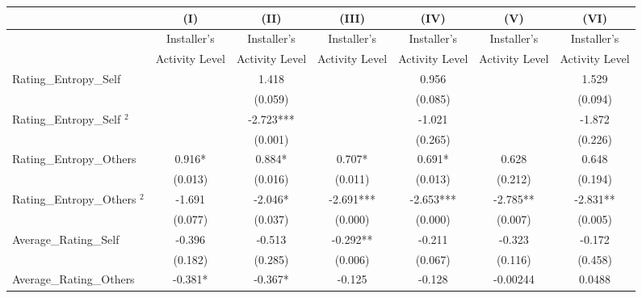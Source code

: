\begin{table}[]
\centering
\begin{threeparttable}[t]
\begin{tabular}{@{}lcccccc@{}}
\toprule
                             & (I)            & (II)           & (III)          & (IV)           & (V)            & (VI)           \\ \midrule
                             & Installer's    & Installer's    & Installer's    & Installer's    & Installer's    & Installer's    \\
                             & Activity Level & Activity Level & Activity Level & Activity Level & Activity Level & Activity Level \\
Rating\_Entropy\_Self        &                & 1.418          &                & 0.956          &                & 1.529          \\
                             &                & (0.059)        &                & (0.085)        &                & (0.094)        \\
Rating\_Entropy\_Self $^2$   &                & -2.723***      &                & -1.021         &                & -1.872         \\
                             &                & (0.001)        &                & (0.265)        &                & (0.226)        \\
Rating\_Entropy\_Others      & 0.916*         & 0.884*         & 0.707*         & 0.691*         & 0.628          & 0.648          \\
                             & (0.013)        & (0.016)        & (0.011)        & (0.013)        & (0.212)        & (0.194)        \\
Rating\_Entropy\_Others $^2$ & -1.691         & -2.046*        & -2.691***      & -2.653***      & -2.785**       & -2.831**       \\
                             & (0.077)        & (0.037)        & (0.000)        & (0.000)        & (0.007)        & (0.005)        \\
Average\_Rating\_Self        & -0.396         & -0.513         & -0.292**       & -0.211         & -0.323         & -0.172         \\
                             & (0.182)        & (0.285)        & (0.006)        & (0.067)        & (0.116)        & (0.458)        \\
Average\_Rating\_Others      & -0.381*        & -0.367*        & -0.125         & -0.128         & -0.00244       & 0.0488         \\

\end{tabular}
\end{threeparttable}
\end{table}
